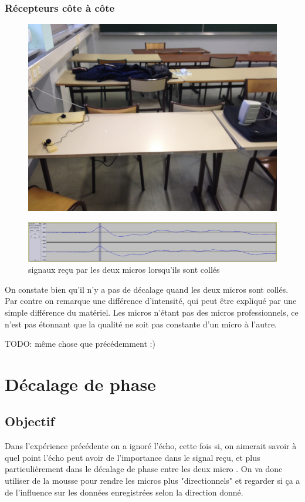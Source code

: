 \documentclass[12pt,a4paper]{report}
\begin{document}
\subsection{Récepteurs côte à côte}
\begin{figure}[H]
\includegraphics[width=\textwidth]{../tests/test_du_protocole/micros_cote_a_cote.jpg} 
\end{figure}

\begin{figure}[H]
\includegraphics[width=\textwidth]{../tests/test_du_protocole/mesures_micro_colles/colles.png} 
\caption{signaux reçu par les deux micros lorsqu'ils sont collés}
\end{figure}
On constate bien qu'il n'y a pas de décalage quand les deux micros sont collés. Par contre on remarque une différence d'intensité, qui peut être expliqué par une simple différence du matériel. Les micros n'étant pas des micros professionnels, ce n'est pas étonnant que la qualité ne soit pas constante d'un micro à l'autre.


TODO: même chose que précédemment :)


\chapter{Décalage de phase}
\section{Objectif}
Dans l'expérience précédente on a ignoré l'écho, cette fois si, on aimerait savoir à quel point l'écho peut avoir de l'importance dans le signal reçu, et plus particulièrement dans le décalage de phase entre les deux micro .
On va donc utiliser de la mousse pour rendre les micros plus "directionnels" et regarder si ça a de l'influence sur les données enregistrées selon la direction donné.
\end{document}
